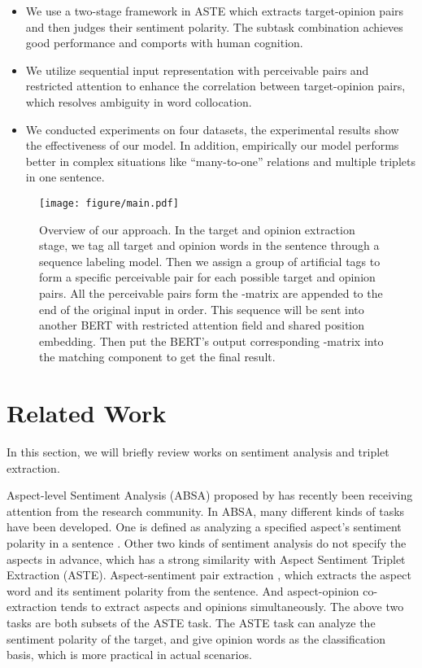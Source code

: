 \documentclass[11pt]{article}
\begin{document}
\begin{itemize}
    \item We use a two-stage framework in ASTE which extracts target-opinion pairs and then judges their sentiment polarity. The subtask combination achieves good performance and comports with human cognition.
    \item We utilize sequential input representation with perceivable pairs and restricted attention to enhance the correlation between target-opinion pairs, which resolves ambiguity in word collocation.
    \item We conducted experiments on four datasets, the experimental results show the effectiveness of our model. In addition, empirically our model performs better in complex situations like ``many-to-one'' relations and multiple triplets in one sentence.
\end{itemize} \begin{figure*}[t]
    \centering
    \texttt{[image: figure/main.pdf]}
    \caption{Overview of our approach. In the target and opinion extraction stage, we tag all target and opinion words in the sentence through a sequence labeling model. Then we assign a group of artificial tags to form a specific perceivable pair  for each possible target  and opinion  pairs. All the perceivable pairs form the -matrix are appended to the end of the original input in order. This sequence will be sent into another BERT with restricted attention field and shared position embedding. Then put the BERT's output corresponding -matrix into the matching component to get the final result. }
    \label{fig:main}
\end{figure*}


 \section{Related Work}
In this section, we will briefly review works on sentiment analysis and triplet extraction.

Aspect-level Sentiment Analysis (ABSA) proposed by \cite{sentiment2014} has recently been receiving attention from the research community. 
In ABSA, many different kinds of tasks have been developed.
One is defined as analyzing a specified aspect's sentiment polarity in a sentence \cite{dong2014adaptive,ma2017interactive,tang2020dependency}. 
Other two kinds of sentiment analysis do not specify the aspects in advance, 
which has a strong similarity with Aspect Sentiment Triplet Extraction (ASTE). Aspect-sentiment pair extraction \cite{li2019unified}, which extracts the aspect word and its sentiment polarity from the sentence. And aspect-opinion co-extraction \cite{li2018aspect} tends to extract aspects and opinions simultaneously. The above two tasks are both subsets of the ASTE task. The ASTE task can analyze the sentiment polarity of the target, and give opinion words as the classification basis, which is more practical in actual scenarios.
\end{document}
